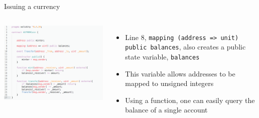 \documentclass[11pt]{beamer}
\begin{document}
\begin{frame}{Issuing a currency}
	\begin{columns}
	    \includegraphics  [scale=0.3]{Images/contract_new}

	    \begin{itemize}
		    \item Line 8, \texttt{mapping (address => unit) public balances}, also creates a public state variable, \texttt{balances}
			\item This variable allows addresses to be mapped to unsigned integers
			\item Using a function, one can easily query the balance of a single account
	    \end{itemize}
	\end{columns}
\end{frame}

\end{document}
